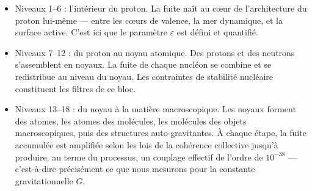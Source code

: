 \documentclass[12pt, a4paper, openright]{book}
\begin{document}
\begin{itemize}
  \item Niveaux 1--6 : l'intérieur du proton. La fuite naît au c\oe{}ur de l'architecture du proton lui-même --- entre les c\oe{}urs de valence, la mer dynamique, et la surface active. C'est ici que le paramètre $\varepsilon$ est défini et quantifié.
  \item Niveaux 7--12 : du proton au noyau atomique. Des protons et des neutrons s'assemblent en noyaux. La fuite de chaque nucléon se combine et se redistribue au niveau du noyau. Les contraintes de stabilité nucléaire constituent les filtres de ce bloc.
  \item Niveaux 13--18 : du noyau à la matière macroscopique. Les noyaux forment des atomes, les atomes des molécules, les molécules des objets macroscopiques, puis des structures auto-gravitantes. À chaque étape, la fuite accumulée est amplifiée selon les lois de la cohérence collective jusqu'à produire, au terme du processus, un couplage effectif de l'ordre de $10^{-38}$ --- c'est-à-dire précisément ce que nous mesurons pour la constante gravitationnelle $G$.
\end{itemize}

\medskip
\end{document}

